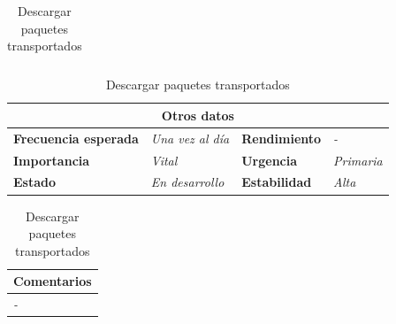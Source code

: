 \documentclass[12pt,spanish]{article}
\begin{document}
\begin{table}[H]
\begin{tabular}{|m{5pt}|m{7.33cm}|m{5pt}|m{7.33cm}|}
		
	\end{tabular}
	
	\vspace{0.5cm}
	
	\begin{tabular}{|m{3.75cm}|m{3.75cm}|m{3.75cm}|m{3.8cm}|}
		\hline
		\multicolumn{4}{|c|}{\textbf{Otros datos}} \\
		\hline
		\textbf{Frecuencia esperada} & \textit{Una vez al día} & \textbf{Rendimiento} & \textit{-} \\
		\hline
		\textbf{Importancia} & \textit{Vital} & \textbf{Urgencia} & \textit{Primaria} \\
		\hline
		\textbf{Estado} & \textit{En desarrollo} & \textbf{Estabilidad} & \textit{Alta} \\
		\hline
	\end{tabular}
	
	\vspace{1cm}
	
	\begin{tabular}{|m{16.2cm}|}
		\hline
		\textbf{Comentarios} \\
		\hline
		\textit{-} \\
		\hline
	\end{tabular}
	
	\caption{Descargar paquetes transportados}
	
\end{table}
\end{document}
